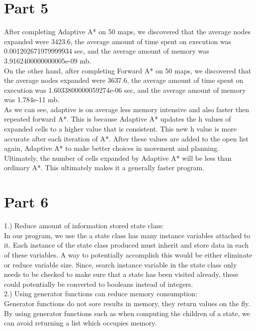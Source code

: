 \documentclass{article}
\begin{document}
\section*{Part 5}

After completing Adaptive A* on 50 maps, we discovered that the average nodes expanded were 3423.6, the average amount of time spent on execution was 0.001202671979999934 sec, and the average amount of memory was 3.9162400000000005e-09 mb.\\
On the other hand, after completing Forward A* on 50 maps, we discovered that the average nodes expanded were 3637.6, the average amount of time spent on execution was 1.6033800000059274e-06 sec, and the average amount of memory was 1.784e-11 mb.\\ 
\bigskip{}
As we can see, adaptive is on average less memory intensive and also faster then repeated forward A*. This is because Adaptive A* updates the h values of expanded cells to a higher value that is consistent. This new h value is more accurate after each iteration of A*. After these values are added to the open list again, Adaptive A* to make better choices in movement and planning. Ultimately, the number of cells expanded by Adaptive A* will be less than ordinary A*. This ultimately makes it a generally faster program.

\section*{Part 6}

\bigskip{}

1.) Reduce amount of information stored state class:\\
In our program, we use the a state class has many instance variables attached to it. Each instance of the state class produced must inherit and store data in each of these variables. A way to potentially accomplish this would be either eliminate or reduce variable size. Since, search instance variable in the state class only needs to be checked to make sure that a state has been visited already, these could potentially be converted to booleans instead of integers.\\
\bigskip{}
2.) Using generator functions can reduce memory consumption:\\
Generator functions do not sore results in memory, they return values on the fly. By using generator functions such as when computing the children of a state, we can avoid returning a list which occupies memory. \\
\end{document}
